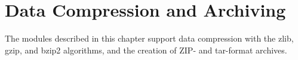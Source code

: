 \chapter{Data Compression and Archiving}
\label{archiving}

The modules described in this chapter support data compression
with the zlib, gzip, and bzip2 algorithms, and 
the creation of ZIP- and tar-format archives.

\localmoduletable
